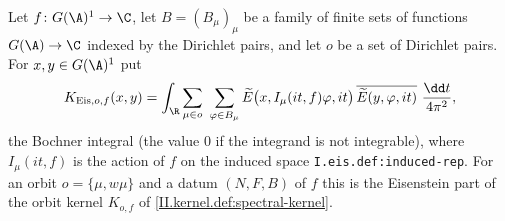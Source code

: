 Let $f\colon G(\A)^1\to\C$, let $B=(B_\mu)_\mu$ be a family of finite sets of functions $G(\A)\to\C$ indexed by the Dirichlet pairs, and let $o$ be a set of Dirichlet pairs. For $x,y\in G(\A)^1$ put
\[
  K_{\mathrm{Eis},o,f}(x,y)=\int_{\R}\sum_{\mu\in o}\ \sum_{\varphi\in B_\mu}\widetilde E\bigl(x,I_\mu(it,f)\varphi,it\bigr)\,\overline{\widetilde E(y,\varphi,it)}\ \frac{\dd t}{4\pi^2},
\]
the Bochner integral (the value $0$ if the integrand is not integrable), where $I_\mu(it,f)$ is the action of $f$ on the induced space \texttt{I.eis.def:induced-rep}. For an orbit $o=\{\mu,w\mu\}$ and a datum $(N,F,B)$ of $f$ this is the Eisenstein part of the orbit kernel $K_{o,f}$ of \cref{II.kernel.def:spectral-kernel}.
